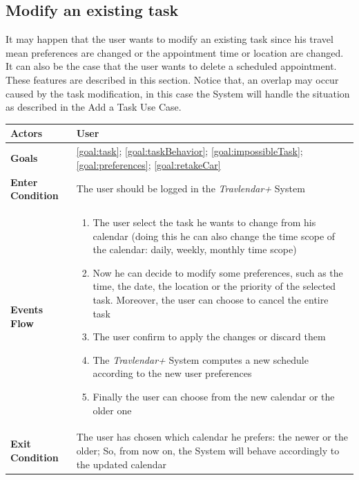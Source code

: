 \subsection{Modify an existing task}

It may happen that the user wants to modify an existing task since his travel mean preferences are changed or the appointment time or location are changed. It can also be the case that the user wants to delete a scheduled appointment. These features are described in this section. Notice that, an overlap may occur caused by the task modification, in this case the System will handle the situation as described in the Add a Task Use Case.

\begin{table}[H]
	\centering
    
    \begin{tabular}{|p{3.5cm}|p{10.3cm}|}
    
    \hline
    \textbf{\large{Actors}}  			& \tabitem User\\
    
    \hline
    \textbf{\large{Goals}} 				& \ref{goal:task}; \ref{goal:taskBehavior}; \ref{goal:impossibleTask}; \ref{goal:preferences}; \ref{goal:retakeCar}\\
    
    \hline
    \textbf{\large{Enter Condition}}	& The user should be logged in the                                                        \emph{Travlendar+} System\\
    
    \hline
    \textbf{\large{Events Flow}}		& \begin{enumerate}[leftmargin=0.5cm]
                                             
                                          	\item The user select the task he wants to change from his calendar (doing this he can also change the time scope of the calendar: daily, weekly, monthly time scope)
                                          	\item Now he can decide to modify some preferences, such as the time, the date, the location or the priority of the selected task. Moreover, the user can choose to cancel the entire task
                                          	\item The user confirm to apply the changes or discard them
                                          	\item The \emph{Travlendar+} System computes a new schedule according to the new user preferences
                                          	\item Finally the user can choose from the new calendar or the older one
                                          \end{enumerate}
    										\\
    \hline
    \textbf{\large{Exit Condition}} 	& The user has chosen which calendar he prefers:                                          the newer or the older; So, from now on, the System will behave accordingly to the updated calendar\\
    

\end{tabular}
\end{table}
